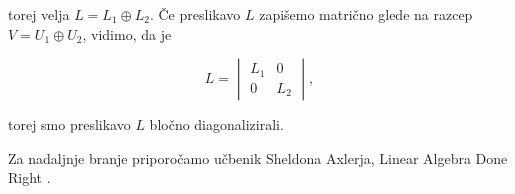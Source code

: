 \documentclass[a4paper,12pt]{article}
\begin{document}
torej velja $L = L_1 \oplus L_2$.
Če preslikavo $L$ zapišemo matrično glede na razcep $V = U_1 \oplus U_2$, vidimo, da je

$$L = \begin{vmatrix}
    L_1 & 0 \\ 0 & L_2    
\end{vmatrix}
,
$$

torej smo preslikavo $L$ bločno diagonalizirali.

Za nadaljnje branje priporočamo učbenik Sheldona Axlerja, Linear Algebra Done Right \cite{axler}.



\end{document}
